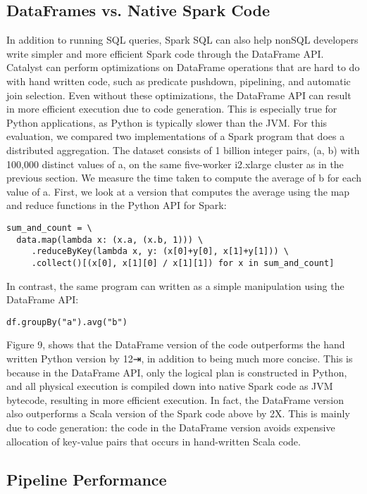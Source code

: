 \documentclass[runningheads,a4paper]{llncs}
\begin{document}
\subsection{DataFrames vs. Native Spark Code}

In addition to running SQL queries, Spark SQL can also help nonSQL developers write simpler and more efficient Spark code through the DataFrame API. Catalyst can perform optimizations on DataFrame operations that are hard to do with hand written code, such as predicate pushdown, pipelining, and automatic join selection. Even without these optimizations, the DataFrame API can result in more efficient execution due to code generation. This is especially true for Python applications, as Python is typically slower than the JVM.
For this evaluation, we compared two implementations of a Spark program that does a distributed aggregation. The dataset consists of 1 billion integer pairs, (a, b) with 100,000 distinct values of a, on the same five-worker i2.xlarge cluster as in the previous section. We measure the time taken to compute the average of b for each value of a. First, we look at a version that computes the average using the map and reduce functions in the Python API for Spark:

\noindent
\begin{verbatim}
sum_and_count = \
  data.map(lambda x: (x.a, (x.b, 1))) \
     .reduceByKey(lambda x, y: (x[0]+y[0], x[1]+y[1])) \
     .collect()[(x[0], x[1][0] / x[1][1]) for x in sum_and_count]
\end{verbatim}

In contrast, the same program can written as a simple manipulation using the DataFrame API:

\noindent
\begin{verbatim}
df.groupBy("a").avg("b")
\end{verbatim}

Figure 9, shows that the DataFrame version of the code outperforms the hand written Python version by 12⇥, in addition to being much more concise. This is because in the DataFrame API, only the logical plan is constructed in Python, and all physical execution is compiled down into native Spark code as JVM bytecode, resulting in more efficient execution. In fact, the DataFrame version also outperforms a Scala version of the Spark code above by 2X. This is mainly due to code generation: the code in the DataFrame version avoids expensive allocation of key-value pairs that occurs in hand-written Scala code.

\subsection{Pipeline Performance}
\end{document}

